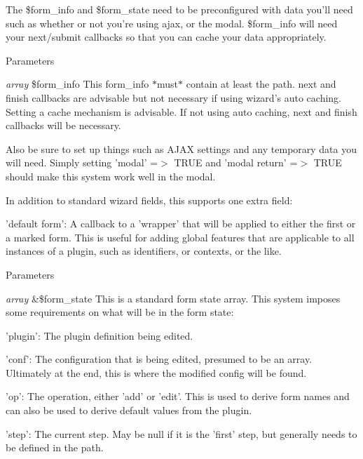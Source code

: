 The \$form\_\-info and \$form\_\-state need to be preconfigured with data you'll need such as whether or not you're using ajax, or the modal. \$form\_\-info will need your next/submit callbacks so that you can cache your data appropriately.


\begin{DoxyParams}{Parameters}
\item[{\em array}]\$form\_\-info This form\_\-info $\ast$must$\ast$ contain at least the path. next and finish callbacks are advisable but not necessary if using wizard's auto caching. Setting a cache mechanism is advisable. If not using auto caching, next and finish callbacks will be necessary.\end{DoxyParams}
Also be sure to set up things such as AJAX settings and any temporary data you will need. Simply setting 'modal' =$>$ TRUE and 'modal return' =$>$ TRUE should make this system work well in the modal.

In addition to standard wizard fields, this supports one extra field:
\begin{DoxyItemize}
\item 'default form': A callback to a 'wrapper' that will be applied to either the first or a marked form. This is useful for adding global features that are applicable to all instances of a plugin, such as identifiers, or contexts, or the like.
\end{DoxyItemize}


\begin{DoxyParams}{Parameters}
\item[{\em array}]\&\$form\_\-state This is a standard form state array. This system imposes some requirements on what will be in the form state:\end{DoxyParams}

\begin{DoxyItemize}
\item 'plugin': The plugin definition being edited.
\item 'conf': The configuration that is being edited, presumed to be an array. Ultimately at the end, this is where the modified config will be found.
\item 'op': The operation, either 'add' or 'edit'. This is used to derive form names and can also be used to derive default values from the plugin.
\item 'step': The current step. May be null if it is the 'first' step, but generally needs to be defined in the path.
\end{DoxyItemize}


